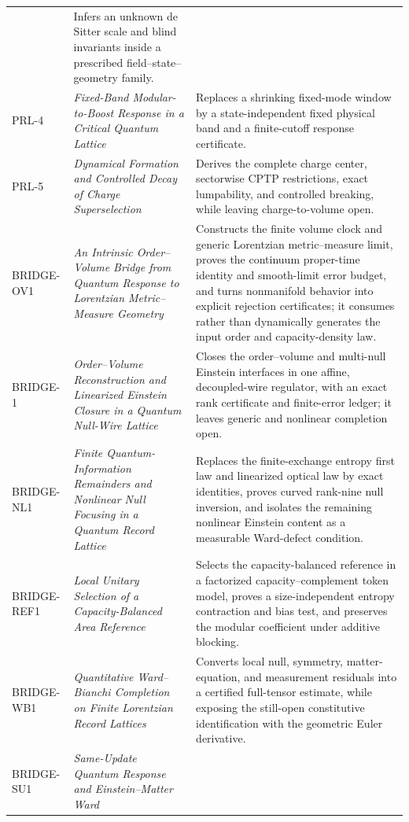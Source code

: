 \begin{longtable}{@{}P{0.10\textwidth}P{0.37\textwidth}P{0.45\textwidth}@{}}
& Infers an unknown de Sitter scale and blind invariants inside a prescribed
field--state--geometry family.\\
PRL-4 & \emph{Fixed-Band Modular-to-Boost Response in a Critical Quantum
Lattice}
& Replaces a shrinking fixed-mode window by a state-independent fixed physical
band and a finite-cutoff response certificate.\\
PRL-5 & \emph{Dynamical Formation and Controlled Decay of Charge
Superselection}
& Derives the complete charge center, sectorwise CPTP restrictions, exact
lumpability, and controlled breaking, while leaving charge-to-volume open.\\
BRIDGE-OV1 & \emph{An Intrinsic Order--Volume Bridge from Quantum Response to
Lorentzian Metric--Measure Geometry}
& Constructs the finite volume clock and generic Lorentzian metric--measure
limit, proves the continuum proper-time identity and smooth-limit error
budget, and turns nonmanifold behavior into explicit rejection certificates;
it consumes rather than dynamically generates the input order and
capacity-density law.\\
BRIDGE-1 & \emph{Order--Volume Reconstruction and Linearized Einstein Closure
in a Quantum Null-Wire Lattice}
& Closes the order--volume and multi-null Einstein interfaces in one affine,
decoupled-wire regulator, with an exact rank certificate and finite-error
ledger; it leaves generic and nonlinear completion open.\\
BRIDGE-NL1 & \emph{Finite Quantum-Information Remainders and Nonlinear Null
Focusing in a Quantum Record Lattice}
& Replaces the finite-exchange entropy first law and linearized optical law by
exact identities, proves curved rank-nine null inversion, and isolates the
remaining nonlinear Einstein content as a measurable Ward-defect condition.\\
BRIDGE-REF1 & \emph{Local Unitary Selection of a Capacity-Balanced Area
Reference}
& Selects the capacity-balanced reference in a factorized
capacity--complement token model, proves a size-independent entropy
contraction and bias test, and preserves the modular coefficient under
additive blocking.\\
BRIDGE-WB1 & \emph{Quantitative Ward--Bianchi Completion on Finite
Lorentzian Record Lattices}
& Converts local null, symmetry, matter-equation, and measurement residuals
into a certified full-tensor estimate, while exposing the still-open
constitutive identification with the geometric Euler derivative.\\
BRIDGE-SU1 & \emph{Same-Update Quantum Response and Einstein--Matter Ward
}
\end{longtable}
